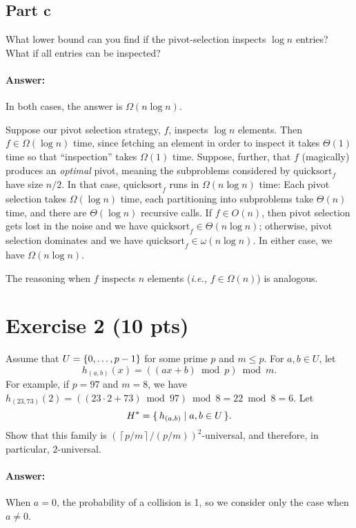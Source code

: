 \documentclass[a4paper]{article}
\newcommand*{\ceil}[1]{\left\lceil{#1}\right\rceil}
\newcommand{\ie}{\emph{i.e.,} }
\begin{document}
\subsection{Part c}

What lower bound can you find if the pivot-selection inspects $\log n$ entries?
What if all entries can be inspected?

\paragraph{Answer:}
In both cases, the answer is $\Omega(n \log n)$.

Suppose our pivot selection strategy, $f$, inspects $\log n$ elements.
Then $f \in \Omega(\log n)$ time, since fetching an element in order to inspect it takes $\Theta(1)$ time so that ``inspection'' takes $\Omega(1)$ time.
Suppose, further, that $f$ (magically) produces an \emph{optimal} pivot, meaning the subproblems considered by $\text{quicksort}_f$ have size $n/2$.
In that case, $\text{quicksort}_f$ runs in $\Omega(n \log n)$ time:
Each pivot selection takes $\Omega(\log n)$ time,
each partitioning into subproblems take $\Theta(n)$ time,
and there are $\Theta(\log n)$ recursive calls.
If $f \in O(n)$, then pivot selection gets lost in the noise and we have $\text{quicksort}_f \in \Theta(n \log n)$;
otherwise, pivot selection dominates and we have $\text{quicksort}_f \in \omega(n \log n)$.
In either case, we have $\Omega(n \log n)$.

The reasoning when $f$ inspects $n$ elements (\ie $f \in \Omega(n)$) is analogous.

\section{Exercise 2 (10 pts)}
\newcommand{\HH}{H^{*}}%

Assume that $U = \{0, \ldots, p-1\}$ for some prime $p$ and $m \le p$.
For $a, b \in U$, let
\[
	h_{(a,b)}(x) = ((ax+b) \bmod p) \bmod m.
\]
For example, if $p=97$ and $m=8$, we have $h_{(23,73)}(2) = ((23\cdot 2+73) \bmod 97) \bmod 8 = 22 \bmod 8 = 6$.
Let
\[
	\HH = \set{\,h_{(a,b)} \mid a,b \in U\,}.
\]
Show that this family is $(\ceil{p/m}/(p/m))^2$-universal, and therefore, in particular, $2$-universal.

\paragraph{Answer:}

When $a=0$, the probability of a collision is 1, so we consider only the case when $a \not= 0$.
\end{document}
